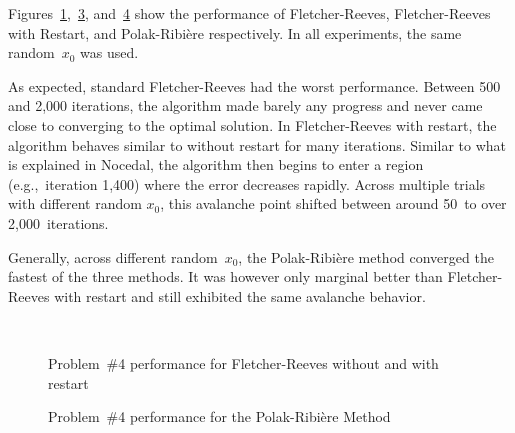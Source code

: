 Figures~\ref{fig:p04:FR},~\ref{fig:p04:FRwithRestart}, and~\ref{fig:p04:PR} show the performance of Fletcher-Reeves, Fletcher-Reeves with Restart, and Polak-Ribi\`{e}re respectively. In all experiments, the same random~$x_0$ was used.  

As expected, standard Fletcher-Reeves had the worst performance. Between 500 and 2,000 iterations, the algorithm made barely any progress and never came close to converging to the optimal solution.  In Fletcher-Reeves with restart, the algorithm behaves similar to without restart for many iterations.  Similar to what is explained in Nocedal, the algorithm then begins to enter a region (e.g.,~iteration 1,400) where the error decreases rapidly.  Across multiple trials with different random $x_0$, this avalanche point shifted between around 50~to over 2,000~iterations.

Generally, across different random~$x_0$, the Polak-Ribi\`{e}re method converged the fastest of the three methods.  It was however only marginal better than Fletcher-Reeves with restart and still exhibited the same avalanche behavior.

\begin{figure}[p]
  \centering
  \begin{subfigure}[t]{0.48\textwidth}
    
    \caption{}\label{fig:p04:FR}
  \end{subfigure}
  ~
  \begin{subfigure}[t]{0.48\textwidth}
    
    \caption{}\label{fig:p04:FRwithRestart}
  \end{subfigure}
  \caption{Problem~\#4 performance for Fletcher-Reeves without and with restart}
\end{figure}

\begin{figure}[p]
  \centering
  
  \caption{Problem~\#4 performance for the Polak-Ribi\`{e}re Method}\label{fig:p04:PR}
\end{figure}
